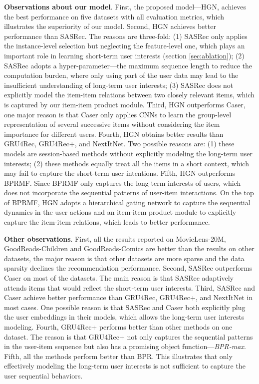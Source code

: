 \documentclass[sigconf]{acmart}
\begin{document}
\textbf{Observations about our model}. First, the proposed model---HGN, achieves the best performance on five datasets with all evaluation metrics, which illustrates the superiority of our model. Second, HGN achieves better performance than SASRec. The reasons are three-fold: (1) SASRec only applies the instance-level selection but neglecting the feature-level one, which plays an important role in learning short-term user interests (section \ref{sec:ablation}); (2) SASRec adopts a hyper-parameter---the maximum sequence length to reduce the computation burden, where only using part of the user data may lead to the insufficient understanding of long-term user interests; (3) SASRec does not explicitly model the item-item relations between two closely relevant items, which is captured by our item-item product module. Third, HGN outperforms Caser, one major reason is that Caser only applies CNNs to learn the group-level representation of several successive items without considering the item importance for different users. Fourth, HGN obtains better results than GRU4Rec, GRU4Rec+, and NextItNet. Two possible reasons are: (1) these models are session-based methods without explicitly modeling the long-term user interests; (2) these methods equally treat all the items in a short context, which may fail to capture the short-term user intentions. Fifth, HGN outperforms BPRMF. Since BPRMF only captures the long-term interests of users, which does not incorporate the sequential patterns of user-item interactions. On the top of BPRMF, HGN adopts a hierarchical gating network to capture the sequential dynamics in the user actions and an item-item product module to explicitly capture the item-item relations, which leads to better performance.

\textbf{Other observations}. First, all the results reported on MovieLens-20M, GoodReads-Children and GoodReads-Comics are better than the results on other datasets, the major reason is that other datasets are more sparse and the data sparsity declines the recommendation performance. Second, SASRec outperforms Caser on most of the datasets. The main reason is that SASRec adaptively attends items that would reflect the short-term user interests. Third, SASRec and Caser achieve better performance than GRU4Rec, GRU4Rec+, and NextItNet in most cases. One possible reason is that SASRec and Caser both explicitly plug the user embeddings in their models, which allows the long-term user interests modeling. Fourth, GRU4Rec+ performs better than other methods on one dataset. The reason is that GRU4Rec+ not only captures the sequential patterns in the user-item sequence but also has a promising object function---\textit{BPR-max}. Fifth, all the methods perform better than BPR. This illustrates that only effectively modeling the long-term user interests is not sufficient to capture the user sequential behaviors.
\end{document}
